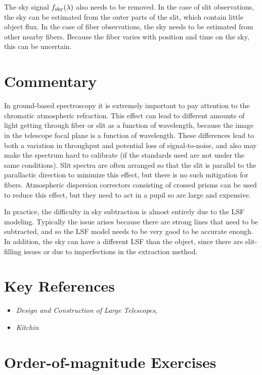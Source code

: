 The sky signal $f_{\rm sky}(\lambda)$ also needs to be removed. In the
case of slit observations, the sky can be estimated from the outer
parts of the slit, which contain little object flux. In the case of
fiber observations, the sky needs to be estimated from other nearby
fibers. Because the fiber varies with position and time on the sky,
this can be uncertain.

\section{Commentary}

In ground-based spectroscopy it is extremely important to pay
attention to the chromatic atmospheric refraction. This effect can
lead to different amounts of light getting through fiber or slit as a
function of wavelength, because the image in the telescope focal plane
is a function of wavelength. These differences lead to both a
variation in throughput and potential loss of signal-to-noise, and
also may make the spectrum hard to calibrate (if the standards used
are not under the same conditions). Slit spectra are often arranged so
that the slit is parallel to the parallactic direction to minimize
this effect, but there is no such mitigation for fibers. Atmospheric
dispersion correctors consisting of crossed prisms can be used to
reduce this effect, but they need to act in a pupil so are large and
expensive.

In practice, the difficulty in sky subtraction is almost entirely due
to the LSF modeling. Typically the issue arises because there are
strong lines that need to be subtracted, and so the LSF model needs to
be very good to be accurate enough. In addition, the sky can have a
different LSF than the object, since there are slit-filling
issues or due to imperfections in the extraction method.

\section{Key References}

\begin{itemize}
  \item
    {\it Design and Construction of Large Telescopes},
      \citet{bely}
  \item
    {\it Kitchin}
\end{itemize}

\citet{gunn06a}

\section{Order-of-magnitude Exercises}

